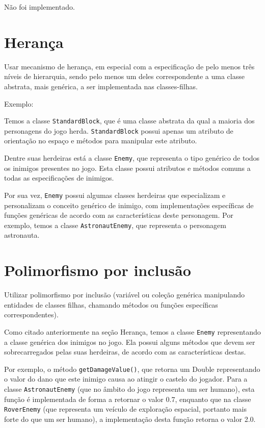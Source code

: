 \documentclass[rel_mlp]{iiufrgs}
\begin{document}
Não foi implementado.


\section{Herança}

Usar mecanismo de herança, em especial com a especificação de pelo menos três níveis de hierarquia, sendo pelo menos um deles correspondente a uma classe abstrata, mais genérica, a ser implementada nas classes-filhas.

Exemplo:

Temos a classe \texttt{StandardBlock}, que é uma classe abstrata da  qual a maioria dos personagens do jogo herda. \texttt{StandardBlock} possui apenas um atributo de orientação no espaço e métodos para manipular este atributo.

Dentre suas herdeiras está a classe \texttt{Enemy}, que representa o tipo genérico de todos os inimigos presentes no jogo. Esta classe possui atributos e métodos comuns a todas as especificações de inimigos.

Por sua vez, \texttt{Enemy} possui algumas classes herdeiras que especializam e personalizam o conceito genérico de inimigo, com implementações específicas de funções genéricas de acordo com as características deste personagem. Por exemplo, temos a classe \texttt{AstronautEnemy}, que representa o personagem astronauta.


\section{Polimorfismo por inclusão}

Utilizar polimorfismo por inclusão (variável ou coleção genérica manipulando entidades de classes filhas, chamando métodos ou funções específicas correspondentes).

Como citado anteriormente na seção Herança, temos a classe \texttt{Enemy} representando a classe genérica dos inimigos no jogo. Ela possui alguns métodos que devem ser sobrecarregados pelas suas herdeiras, de acordo com as características destas.

Por exemplo, o método \texttt{getDamageValue()}, que retorna um Double representando o valor do dano que este inimigo causa ao atingir o castelo do jogador. Para a classe \texttt{AstronautEnemy} (que no âmbito do jogo representa um ser humano), esta função é implementada de forma a retornar o valor 0.7, enquanto que na classe \texttt{RoverEnemy} (que representa um veículo de exploração espacial, portanto mais forte do que um ser humano), a implementação desta função retorna o valor 2.0.
\end{document}
